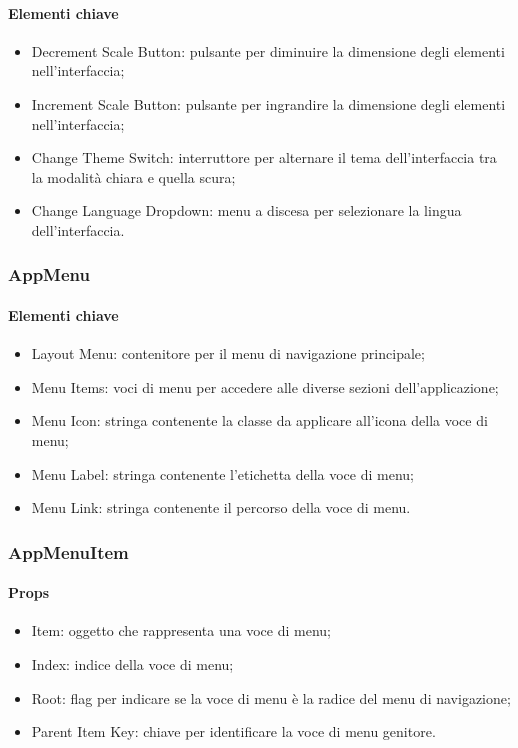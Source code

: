 \paragraph*{Elementi chiave}
\begin{itemize}
  \item Decrement Scale Button: pulsante per diminuire la dimensione degli elementi nell'interfaccia;
  \item Increment Scale Button: pulsante per ingrandire la dimensione degli elementi nell'interfaccia;
  \item Change Theme Switch: interruttore per alternare il tema dell'interfaccia tra la modalità chiara e quella scura;
  \item Change Language Dropdown: menu a discesa per selezionare la lingua dell'interfaccia.
\end{itemize}

\subsubsection{AppMenu}

\paragraph*{Elementi chiave}
\begin{itemize}
  \item Layout Menu: contenitore per il menu di navigazione principale;
  \item Menu Items: voci di menu per accedere alle diverse sezioni dell'applicazione;
  \item Menu Icon: stringa contenente la classe da applicare all'icona della voce di menu;
  \item Menu Label: stringa contenente l'etichetta della voce di menu;
  \item Menu Link: stringa contenente il percorso della voce di menu.
\end{itemize}

\subsubsection{AppMenuItem}

\paragraph*{Props}
\begin{itemize}
  \item Item: oggetto che rappresenta una voce di menu;
  \item Index: indice della voce di menu;
  \item Root: flag per indicare se la voce di menu è la radice del menu di navigazione;
  \item Parent Item Key: chiave per identificare la voce di menu genitore.
\end{itemize}

